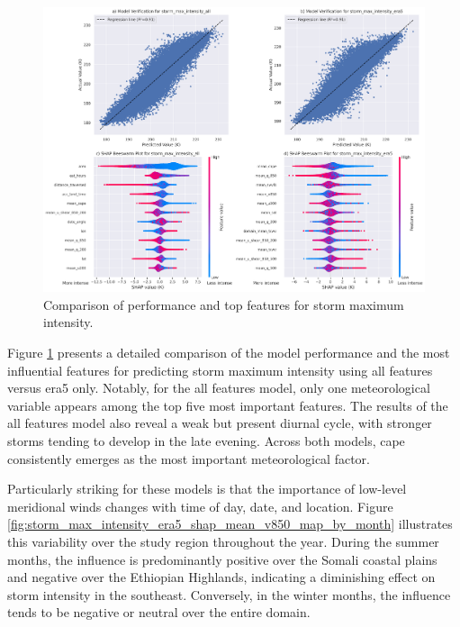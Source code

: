 \begin{figure}[ht]
    \centering
    \includegraphics[width=\textwidth]{../figures/generated/experiments/storm_max_intensity/storm_max_intensity_summary.png}
    \caption{Comparison of performance and top features for storm maximum intensity.}
    \label{fig:storm_max_intensity_summary}
\end{figure}

Figure \ref{fig:storm_max_intensity_summary} presents a detailed comparison of the model performance and the most influential features for predicting storm maximum intensity using all features versus \acrshort{era5} only. Notably, for the all features model, only one meteorological variable appears among the top five most important features. The results of the all features model also reveal a weak but present diurnal cycle, with stronger storms tending to develop in the late evening. Across both models, \acrshort{cape} consistently emerges as the most important meteorological factor.

Particularly striking for these models is that the importance of low-level meridional winds changes with time of day, date, and location. Figure \ref{fig:storm_max_intensity_era5_shap_mean_v850_map_by_month} illustrates this variability over the study region throughout the year. During the summer months, the influence is predominantly positive over the Somali coastal plains and negative over the Ethiopian Highlands, indicating a diminishing effect on storm intensity in the southeast. Conversely, in the winter months, the influence tends to be negative or neutral over the entire domain.

